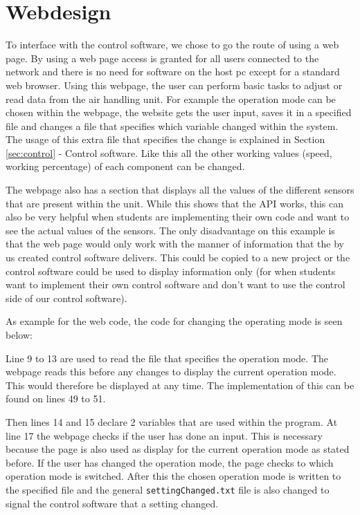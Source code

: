 \documentclass[a4paper,oneside]{book}
\begin{document}
\section{Webdesign}
To interface with the control software, we chose to go the route of using a web
page. By using a web page access is granted for all users connected to the
network and there is no need for software on the host pc except for a standard
web browser. Using this webpage, the user can perform basic tasks to adjust or
read data from the air handling unit. For example the operation mode can be
chosen within the webpage, the website gets the user input, saves it in a
specified file and changes a file that specifies which variable changed within
the system. The usage of this extra file that specifies the change is explained
in Section \ref{sec:control} - Control software. Like this all the other
working values (speed, working percentage) of each component can be changed.

The webpage also has a section that displays all the values of the different
sensors that are present within the unit. While this shows that the API works,
this can also be very helpful when students are implementing their own code and
want to see the actual values of the sensors. The only disadvantage on this
example is that the web page would only work with the manner of information
that the by us created control software delivers. This could be copied to a new
project or the control software could be used to display information only (for
when students want to implement their own control software and don't want to
use the control side of our control software).

As example for the web code, the code for changing the operating mode is seen
below:



Line 9 to 13 are used to read the file that specifies the operation mode. The
webpage reads this before any changes to display the current operation mode.
This would therefore be displayed at any time. The implementation of this can
be found on lines 49 to 51.

Then lines 14 and 15 declare 2 variables that are used within the program. At
line 17 the webpage checks if the user has done an input. This is necessary
because the page is also used as display for the current operation mode as
stated before. If the user has changed the operation mode, the page checks to
which operation mode is switched. After this the chosen operation mode is
written to the specified file and the general \lstinline|settingChanged.txt|
file is also changed to signal the control software that a setting changed.
\end{document}
